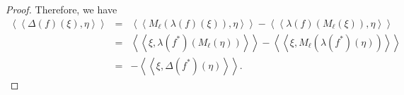 \documentclass[a4paper,11pt,reqno]{amsart}
\theoremstyle{plain}
\theoremstyle{named}
\numberwithin{equation}{section}
\newcommand{\Bea}{\begin{eqnarray*}}
\newcommand{\Eea}{\end{eqnarray*}}
\begin{document}
\begin{proof}
				
				
Therefore, we have 
\Bea
	\left \langle \left \langle \Delta (f) (\xi), \eta \right \rangle \right \rangle & = &  \left \langle \left \langle M_{\ell} (\lambda (f) (\xi)), \eta \right \rangle \right \rangle - \left \langle \left \langle \lambda (f) (M_{\ell} (\xi)), \eta \right \rangle \right \rangle \\ & = &  \left \langle \left \langle \xi, \lambda (f^{\ast}) \left (M_{\ell} (\eta) \right ) \right \rangle \right \rangle - \left \langle \left \langle \xi, M_{\ell} \left (\lambda (f^{\ast}) (\eta) \right ) \right \rangle \right \rangle \\ & = &  - \left \langle \left \langle \xi, \Delta (f^{\ast}) (\eta) \right \rangle \right \rangle.  
\Eea
				

\end{proof}
\end{document}
